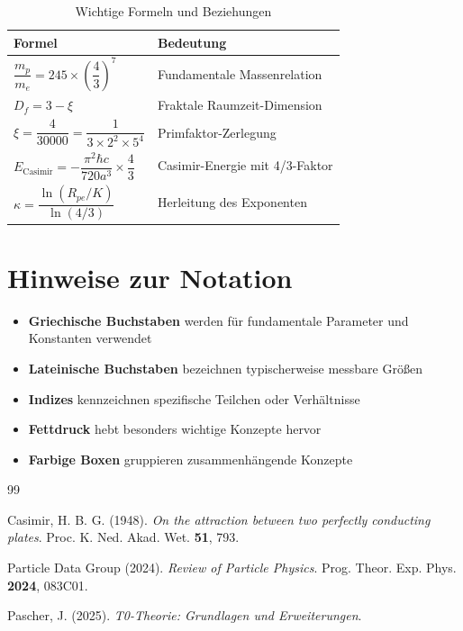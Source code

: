	\begin{table}[htbp]
		\centering
		\begin{tabular}{p{4cm}p{8cm}}
			\toprule
			\textbf{Formel} & \textbf{Bedeutung} \\
			\midrule
			$\dfrac{m_p}{m_e} = 245 \times \left( \dfrac{4}{3} \right)^7$ & Fundamentale Massenrelation \\
			$D_f = 3 - \xi$ & Fraktale Raumzeit-Dimension \\
			$\xi = \dfrac{4}{30000} = \dfrac{1}{3 \times 2^2 \times 5^4}$ & Primfaktor-Zerlegung \\
			$E_{\text{Casimir}} = -\dfrac{\pi^2 \hbar c}{720 a^3} \times \dfrac{4}{3}$ & Casimir-Energie mit 4/3-Faktor \\
			$\kappa = \dfrac{\ln(R_{pe}/K)}{\ln(4/3)}$ & Herleitung des Exponenten \\
			\bottomrule
		\end{tabular}
		\caption{Wichtige Formeln und Beziehungen}
	\end{table}
	
	\section*{Hinweise zur Notation}
	
	\begin{itemize}
		\item \textbf{Griechische Buchstaben} werden für fundamentale Parameter und Konstanten verwendet
		\item \textbf{Lateinische Buchstaben} bezeichnen typischerweise messbare Größen
		\item \textbf{Indizes} kennzeichnen spezifische Teilchen oder Verhältnisse
		\item \textbf{Fettdruck} hebt besonders wichtige Konzepte hervor
		\item \textbf{Farbige Boxen} gruppieren zusammenhängende Konzepte
	\end{itemize}
	
	\begin{thebibliography}{99}
		
		Casimir, H. B. G. (1948). \textit{On the attraction between two perfectly conducting plates}.
		Proc. K. Ned. Akad. Wet. \textbf{51}, 793.
		
		Particle Data Group (2024). \textit{Review of Particle Physics}.
		Prog. Theor. Exp. Phys. \textbf{2024}, 083C01.
		
		Pascher, J. (2025). \textit{T0-Theorie: Grundlagen und Erweiterungen}.

	\end{thebibliography}
	